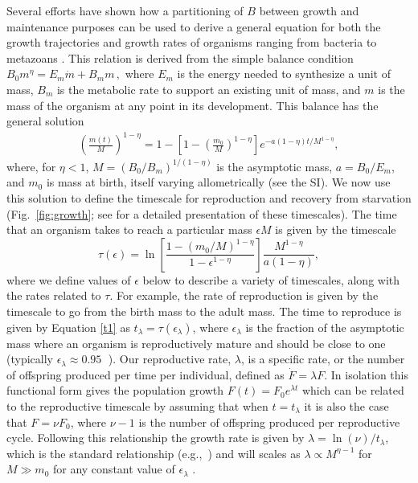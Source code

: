 \documentclass[twocolumn,preprintnumbers,amsmath,amssymb,superscriptaddress]{revtex4}
\begin{document}
{Several efforts have shown how a partitioning of $B$ between growth and
maintenance purposes can be used to derive a general equation for both the
growth trajectories and growth rates of organisms ranging from bacteria to
metazoans
\citep{West:2001bv,moses2008rmo,gillooly2002esa,hou,savage2004effects,Kempes:2012hy}. This relation is derived from the simple balance condition 
$B_{0}m^{\eta}=E_{m}\dot{m}+B_{m}m\,,$
\citep{West:2001bv,moses2008rmo,gillooly2002esa,hou,savage2004effects,Kempes:2012hy} where $E_{m}$ is the energy needed to synthesize a unit of mass, $B_{m}$ is
the metabolic rate to support an existing unit of mass, and $m$ is the mass
of the organism at any point in its development.  This balance has the
general solution \citep{bettencourt,Kempes:2012hy}
\begin{eqnarray}
\label{m1}
\left(\frac{m\left(t\right)}{M}\right)^{1-\eta}\!=1\!-\!\left[1\!-\!\left(\frac{m_{0}}{M}\right)^{1\!-\!\eta}\right]e^{-a\left(1\!-\!\eta\right)t/M^{1-\eta}},
\end{eqnarray}
where, for $\eta<1$, $M=(B_{0}/B_{m})^{1/(1-\eta)}$ is the asymptotic mass,
$a=B_{0}/E_{m}$, and $m_0$ is mass at birth, itself varying allometrically
(see the SI).  We now use this solution to define the timescale for
reproduction and recovery from starvation (Fig.~\ref{fig:growth}; see
\citep{moses2008rmo} for a detailed presentation of these timescales). The
time that an organism takes to reach a particular mass $\epsilon M$ is given
by the timescale
\begin{equation}
\label{t1}
\tau\left(\epsilon\right) = \ln\left[\frac{1-\left(m_{0}/M\right)^{1-\eta}}{1-\epsilon^{1-\eta}}\right]\frac{M^{1-\eta}}{a\left(1-\eta\right)},
\end{equation}
where we define values of $\epsilon$ below to describe a variety of
timescales, along with the rates related to $\tau$.  For example, the rate of
reproduction is given by the timescale to go from the birth mass to the adult
mass. The time to reproduce is given by Equation \ref{t1} as
$t_{\lambda}=\tau\left(\epsilon_{\lambda}\right)$, where $\epsilon_{\lambda}$
is the fraction of the asymptotic mass where an organism is reproductively
mature and should be close to one (typically
$\epsilon_{\lambda}\approx0.95\;$ \citep{West:2001bv}). Our reproductive
rate, $\lambda$, is a specific rate, or the number of offspring produced per
time per individual, defined as $\dot{F} = \lambda F$. In isolation this
functional form gives the population growth
$F\left(t\right) = F_{0}e^{\lambda t}$ which can be related to the
reproductive timescale by assuming that when $t=t_{\lambda}$ it is also the
case that $F=\nu F_{0}$, where $\nu-1$ is the number of offspring produced
per reproductive cycle. Following this relationship the growth rate is given
by $\lambda=\ln\left(\nu\right)/t_{\lambda}$, which is the standard
relationship (e.g.,~\cite{savage2004effects}) and will scales as
$\lambda\propto M^{\eta-1}$ for $M\gg m_{0}$ for any constant value of
$\epsilon_{\lambda}$
\citep{West:2001bv,moses2008rmo,gillooly2002esa,hou,Kempes:2012hy}.


}
\end{document}
